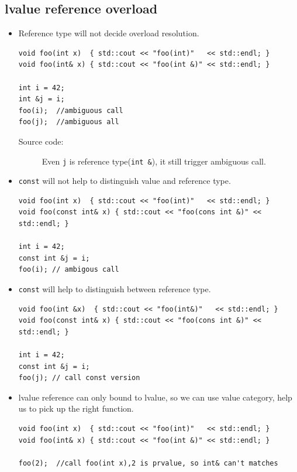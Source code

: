 \documentclass[a4paper,11pt,twoside]{book}
\begin{document}
\subsection{lvalue reference overload}
\begin{itemize}
		\item Reference type will not decide overload resolution.
\begin{lstlisting}[numbers=none]
void foo(int x)  { std::cout << "foo(int)"   << std::endl; }
void foo(int& x) { std::cout << "foo(int &)" << std::endl; }

int i = 42;
int &j = i;
foo(i);  //ambiguous call
foo(j);  //ambiguous all
\end{lstlisting}
\begin{description}
	\item[Source code:] Even \texttt{j} is reference type(\texttt{int \&}), it still trigger ambiguous call.
\end{description}

		\item \texttt{const} will not help to distinguish value and reference type.
\begin{lstlisting}[numbers=none]
void foo(int x)  { std::cout << "foo(int)"   << std::endl; }
void foo(const int& x) { std::cout << "foo(cons int &)" << std::endl; }

int i = 42;
const int &j = i;
foo(i); // ambigous call
\end{lstlisting}

	\item \texttt{const} will help to distinguish between reference type.
\begin{lstlisting}[numbers=none]
void foo(int &x)  { std::cout << "foo(int&)"   << std::endl; }
void foo(const int& x) { std::cout << "foo(cons int &)" << std::endl; }
	
int i = 42;
const int &j = i;
foo(j); // call const version
\end{lstlisting}


		\item lvalue reference can only bound to lvalue, so we can use value category, help us to pick up the right function.
\begin{lstlisting}[numbers=none]
void foo(int x)  { std::cout << "foo(int)"   << std::endl; }
void foo(int& x) { std::cout << "foo(int &)" << std::endl; }

foo(2);	 //call foo(int x),2 is prvalue, so int& can't matches
\end{lstlisting}


\end{itemize}
\end{document}
